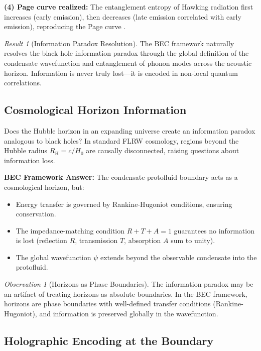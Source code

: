\documentclass[11pt,a4paper]{article}
\newcommand{\RH}{\ensuremath{R_{\mathrm{H}}}}
\theoremstyle{definition}
\theoremstyle{remark}
\newtheorem{result}[theorem]{Result}
\newtheorem{observation}[theorem]{Observation}
\begin{document}
\textbf{(4) Page curve realized:} The entanglement entropy of Hawking radiation first increases (early emission), then decreases (late emission correlated with early emission), reproducing the Page curve \cite{Page1993}.

\begin{result}[Information Paradox Resolution]
The BEC framework naturally resolves the black hole information paradox through the global definition of the condensate wavefunction and entanglement of phonon modes across the acoustic horizon. Information is never truly lost---it is encoded in non-local quantum correlations.
\end{result}

\subsection{Cosmological Horizon Information}
\label{sec:cosmo_horizon}

Does the Hubble horizon in an expanding universe create an information paradox analogous to black holes? In standard FLRW cosmology, regions beyond the Hubble radius $\RH = c/H_0$ are causally disconnected, raising questions about information loss.

\textbf{BEC Framework Answer:} The condensate-protofluid boundary acts as a cosmological horizon, but:
\begin{itemize}
\item Energy transfer is governed by Rankine-Hugoniot conditions, ensuring conservation.
\item The impedance-matching condition $R + T + A = 1$ guarantees no information is lost (reflection $R$, transmission $T$, absorption $A$ sum to unity).
\item The global wavefunction $\psi$ extends beyond the observable condensate into the protofluid.
\end{itemize}

\begin{observation}[Horizons as Phase Boundaries]
The information paradox may be an artifact of treating horizons as absolute boundaries. In the BEC framework, horizons are phase boundaries with well-defined transfer conditions (Rankine-Hugoniot), and information is preserved globally in the wavefunction.
\end{observation}

\subsection{Holographic Encoding at the Boundary}
\label{sec:holographic_boundary}
\end{document}
